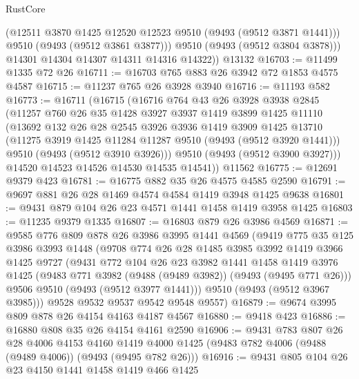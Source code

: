 \begin{lexlean}{RustCore}
\begin{coremodule}
            (@12511 @3870 @1425 @12520 @12523 @9510 (@9493 (@9512 @3871 @1441)))
            @9510
            (@9493 (@9512 @3861 @3877)))
          @9510
          (@9493 (@9512 @3804 @3878)))
        @14301
        @14304
        @14307
        @14311
        @14316
        @14322))
    @13132
@16703 := @11499 @1335 @72 @26
@16711 := @16703 @765 @883 @26 @3942 @72 @1853 @4575 @4587
@16715 := @11237 @765 @26 @3928 @3940
@16716 := @11193 @582
@16773 := @16711
    (@16715
      (@16716
        @764
        @43
        @26
        @3928
        @3938
        @2845
        (@11257
          @760
          @26
          @35
          @1428
          @3927
          @3937
          @1419
          @3899
          @1425
          @11110
          (@13692
            @132
            @26
            @28
            @2545
            @3926
            @3936
            @1419
            @3909
            @1425
            @13710
            (@11275 @3919 @1425 @11284 @11287 @9510 (@9493 (@9512 @3920 @1441)))
            @9510
            (@9493 (@9512 @3910 @3926)))
          @9510
          (@9493 (@9512 @3900 @3927)))
        @14520
        @14523
        @14526
        @14530
        @14535
        @14541))
    @11562
@16775 := @12691 @9379 @423
@16781 := @16775 @882 @35 @26 @4575 @4585 @2590
@16791 := @9697 @881 @26 @28 @1469 @4574 @4584 @1419 @3948 @1425 @9638
@16801 := @9431 @879 @104 @26 @23 @4571 @1441 @1458 @1419 @3958 @1425
@16803 := @11235 @9379 @1335
@16807 := @16803 @879 @26 @3986 @4569
@16871 := @9585
    @776
    @809
    @878
    @26
    @3986
    @3995
    @1441
    @4569
    (@9419
      @775
      @35
      @125
      @3986
      @3993
      @1448
      (@9708
        @774
        @26
        @28
        @1485
        @3985
        @3992
        @1419
        @3966
        @1425
        @9727
        (@9431
          @772
          @104
          @26
          @23
          @3982
          @1441
          @1458
          @1419
          @3976
          @1425
          (@9483 @771 @3982 (@9488 (@9489 @3982)) (@9493 (@9495 @771 @26)))
          @9506
          @9510
          (@9493 (@9512 @3977 @1441)))
        @9510
        (@9493 (@9512 @3967 @3985)))
      @9528
      @9532
      @9537
      @9542
      @9548
      @9557)
@16879 := @9674 @3995 @809 @878 @26 @4154 @4163 @4187 @4567
@16880 := @9418 @423
@16886 := @16880 @808 @35 @26 @4154 @4161 @2590
@16906 := @9431
    @783
    @807
    @26
    @28
    @4006
    @4153
    @4160
    @1419
    @4000
    @1425
    (@9483 @782 @4006 (@9488 (@9489 @4006)) (@9493 (@9495 @782 @26)))
@16916 := @9431 @805 @104 @26 @23 @4150 @1441 @1458 @1419 @466 @1425

\end{coremodule}
\end{lexlean}
